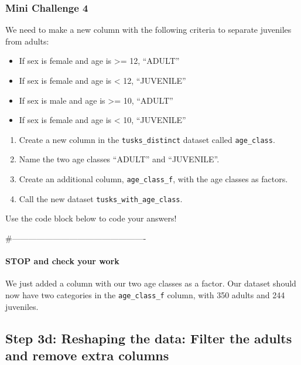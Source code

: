 \documentclass[
]{article}
\providecommand{\tightlist}{%
  \setlength{\itemsep}{0pt}\setlength{\parskip}{0pt}}
\begin{document}
\subsubsection{\texorpdfstring{\textbf{Mini Challenge
4}}{Mini Challenge 4}}\label{mini-challenge-4}

We need to make a new column with the following criteria to separate
juveniles from adults:

\begin{itemize}
\tightlist
\item
  If sex is female and age is \textgreater= 12, ``ADULT''
\item
  If sex is female and age is \textless{} 12, ``JUVENILE''
\item
  If sex is male and age is \textgreater= 10, ``ADULT''
\item
  If sex is female and age is \textless{} 10, ``JUVENILE''
\end{itemize}

\begin{enumerate}
\def\labelenumi{\arabic{enumi}.}
\tightlist
\item
  Create a new column in the \texttt{tusks\_distinct} dataset called
  \texttt{age\_class}.
\item
  Name the two age classes ``ADULT'' and ``JUVENILE''.
\item
  Create an additional column, \texttt{age\_class\_f}, with the age
  classes as factors.
\item
  Call the new dataset \texttt{tusks\_with\_age\_class}.
\end{enumerate}

Use the code block below to code your answers!

\#-------------------------------------------------

\paragraph{\texorpdfstring{\textbf{STOP and check your
work}}{STOP and check your work}}\label{stop-and-check-your-work-2}

We just added a column with our two age classes as a factor. Our dataset
should now have two categories in the \texttt{age\_class\_f} column,
with 350 adults and 244 juveniles.

\subsection{\texorpdfstring{Step 3d: \textbf{Reshaping the data: Filter
the adults and remove extra
columns}}{Step 3d: Reshaping the data: Filter the adults and remove extra columns}}\label{step-3d-reshaping-the-data-filter-the-adults-and-remove-extra-columns}
\end{document}
